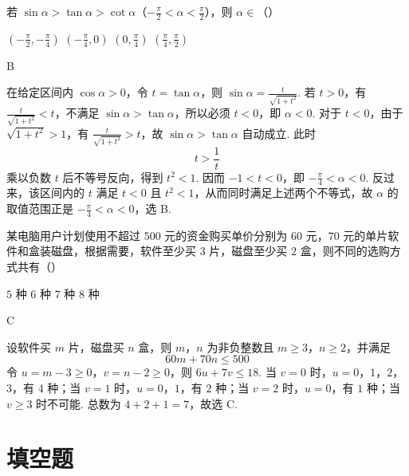 \begin{problem}
若 \(\sin\alpha>\tan\alpha>\cot\alpha\)（\(-\frac{\pi}{2}<\alpha<\frac{\pi}{2}\)），则 \(\alpha\in\)（\quad）

\choices
    {\(\left(-\frac{\pi}{2},-\frac{\pi}{4}\right)\)}
    {\(\left(-\frac{\pi}{4},0\right)\)}
    {\(\left(0,\frac{\pi}{4}\right)\)}
    {\(\left(\frac{\pi}{4},\frac{\pi}{2}\right)\)}
\end{problem}

\begin{answer}
B
\end{answer}

\begin{solution}
在给定区间内 \(\cos\alpha>0\)，令 \(t=\tan\alpha\)，则
\(\sin\alpha=\frac{t}{\sqrt{1+t^2}}\). 若 \(t>0\)，有
\(\frac{t}{\sqrt{1+t^2}}<t\)，不满足 \(\sin\alpha>\tan\alpha\)，所以必须 \(t<0\)，即 \(\alpha<0\). 对于 \(t<0\)，由于 \(\sqrt{1+t^2}>1\)，有
\(\frac{t}{\sqrt{1+t^2}}>t\)，故 \(\sin\alpha>\tan\alpha\) 自动成立. 此时
\[
t>\frac1t
\]
乘以负数 \(t\) 后不等号反向，得到 \(t^2<1\). 因而 \(-1<t<0\)，即
\(-\frac{\pi}{4}<\alpha<0\). 反过来，该区间内的 \(t\) 满足 \(t<0\) 且 \(t^2<1\)，从而同时满足上述两个不等式，故 \(\alpha\) 的取值范围正是 \(-\frac{\pi}{4}<\alpha<0\)，选 B.
\end{solution}

\begin{problem}
某电脑用户计划使用不超过 \(500\) 元的资金购买单价分别为 \(60\) 元，\(70\) 元的单片软件和盒装磁盘，根据需要，软件至少买 \(3\) 片，磁盘至少买 \(2\) 盒，则不同的选购方式共有（\quad）

\choices
    {\(5\) 种}
    {\(6\) 种}
    {\(7\) 种}
    {\(8\) 种}
\end{problem}

\begin{answer}
C
\end{answer}

\begin{solution}
设软件买 \(m\) 片，磁盘买 \(n\) 盒，则 \(m\)，\(n\) 为非负整数且
\(m\ge3\)，\(n\ge2\)，并满足
\[
60m+70n\le500
\]
令 \(u=m-3\ge0\)，\(v=n-2\ge0\)，则
\(6u+7v\le18\). 当 \(v=0\) 时，\(u=0\)，\(1\)，\(2\)，\(3\)，有 \(4\) 种；当 \(v=1\) 时，\(u=0\)，\(1\)，有 \(2\) 种；当 \(v=2\) 时，\(u=0\)，有 \(1\) 种；当 \(v\ge3\) 时不可能. 总数为 \(4+2+1=7\)，故选 C.
\end{solution}

\section{填空题}

